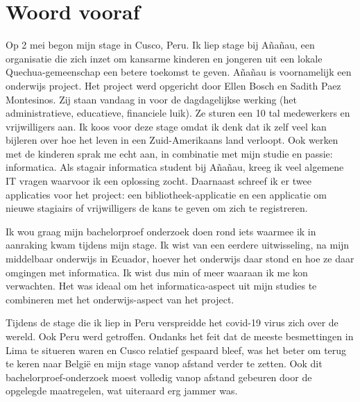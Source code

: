 
\chapter*{Woord vooraf}
\label{ch:voorwoord}


Op 2 mei begon mijn stage in Cusco, Peru. Ik liep stage bij Añañau, een organisatie die zich inzet om kansarme kinderen en jongeren uit een lokale Quechua-gemeenschap een betere toekomst te geven. Añañau is voornamelijk een onderwijs project. Het project werd opgericht door Ellen Bosch en Sadith Paez Montesinos. Zij staan vandaag in voor de dagdagelijkse werking (het administratieve, educatieve, financiele luik). Ze sturen een 10 tal medewerkers en vrijwilligers aan. Ik koos voor deze stage omdat ik denk dat ik zelf veel kan bijleren over hoe het leven in een Zuid-Amerikaans land verloopt. Ook werken met de kinderen sprak me echt aan, in combinatie met mijn studie en passie: informatica. Als stagair informatica student bij Añañau, kreeg ik veel algemene IT vragen waarvoor ik een oplossing zocht. Daarnaast schreef ik er twee applicaties voor het project: een bibliotheek-applicatie en een applicatie om nieuwe stagiairs of vrijwilligers de kans te geven om zich te registreren. 

Ik wou graag mijn bachelorproef onderzoek doen rond iets waarmee ik in aanraking kwam tijdens mijn stage. Ik wist van een eerdere uitwisseling, na mijn middelbaar onderwijs in Ecuador, hoever het onderwijs daar stond en hoe ze daar omgingen met informatica. Ik wist dus min of meer waaraan ik me kon verwachten. Het was ideaal om het informatica-aspect uit mijn studies te combineren met het onderwijs-aspect van het project. 

Tijdens de stage die ik liep in Peru verspreidde het covid-19 virus zich over de wereld. Ook Peru werd getroffen. Ondanks het feit dat de meeste besmettingen in Lima te situeren waren en Cusco relatief gespaard bleef, was het beter om terug te keren naar België en mijn stage vanop afstand verder te zetten. Ook dit bachelorproef-onderzoek moest volledig vanop afstand gebeuren door de opgelegde maatregelen, wat uiteraard erg jammer was.

